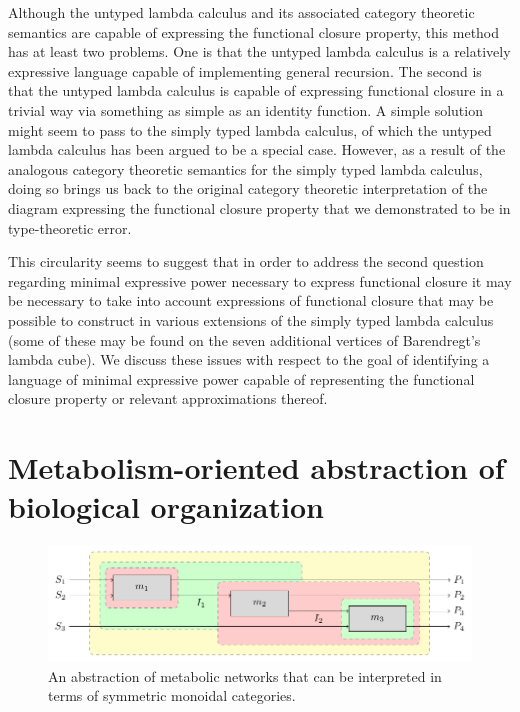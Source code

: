 \documentclass[10pt]{article}
\begin{document}
Although the untyped lambda calculus and its associated category theoretic semantics are capable of expressing the functional closure property, this method has at least two problems. One is that the untyped lambda calculus is a relatively expressive language capable of implementing general recursion. The second is that the untyped lambda calculus is capable of expressing functional closure in a trivial way via something as simple as an identity function. A simple solution might seem to pass to the simply typed lambda calculus, of which the untyped lambda calculus has been argued to be a special case. However, as a result of the analogous category theoretic semantics for the simply typed lambda calculus, doing so brings us back to the original category theoretic interpretation of the diagram expressing the functional closure property that we demonstrated to be in type-theoretic error.

This circularity seems to suggest that in order to address the second question regarding minimal expressive power necessary to express functional closure it may be necessary to take into account expressions of functional closure that may be possible to construct in various extensions of the simply typed lambda calculus (some of these may be found on the seven additional vertices of Barendregt's lambda cube). We discuss these issues with respect to the goal of identifying a language of minimal expressive power capable of representing the functional closure property or relevant approximations thereof.

\section*{Metabolism-oriented abstraction of biological organization}
\begin{figure}
\begin{center}
\noindent\includegraphics[width=0.9\columnwidth]{fig/blockdiagtop.pdf}
\end{center}
\caption{An abstraction of metabolic networks that can be interpreted in terms of symmetric monoidal categories.}
\label{fig:metabolicstringdiag}
\end{figure}
\end{document}
